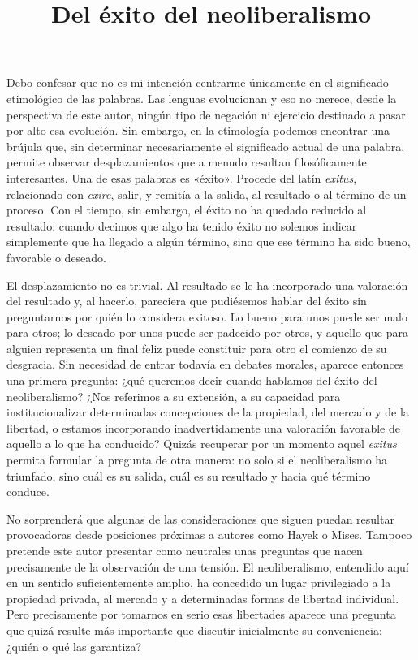 \documentclass[12pt,a4paper]{article}
\title{Del éxito del neoliberalismo}
\author{}
\date{}
\begin{document}
\maketitle

Debo confesar que no es mi intención centrarme únicamente en el significado etimológico de las palabras. Las lenguas evolucionan y eso no merece, desde la perspectiva de este autor, ningún tipo de negación ni ejercicio destinado a pasar por alto esa evolución. Sin embargo, en la etimología podemos encontrar una brújula que, sin determinar necesariamente el significado actual de una palabra, permite observar desplazamientos que a menudo resultan filosóficamente interesantes. Una de esas palabras es «éxito». Procede del latín \textit{exitus}, relacionado con \textit{exire}, salir, y remitía a la salida, al resultado o al término de un proceso. Con el tiempo, sin embargo, el éxito no ha quedado reducido al resultado: cuando decimos que algo ha tenido éxito no solemos indicar simplemente que ha llegado a algún término, sino que ese término ha sido bueno, favorable o deseado.

El desplazamiento no es trivial. Al resultado se le ha incorporado una valoración del resultado y, al hacerlo, pareciera que pudiésemos hablar del éxito sin preguntarnos por quién lo considera exitoso. Lo bueno para unos puede ser malo para otros; lo deseado por unos puede ser padecido por otros, y aquello que para alguien representa un final feliz puede constituir para otro el comienzo de su desgracia. Sin necesidad de entrar todavía en debates morales, aparece entonces una primera pregunta: ¿qué queremos decir cuando hablamos del éxito del neoliberalismo? ¿Nos referimos a su extensión, a su capacidad para institucionalizar determinadas concepciones de la propiedad, del mercado y de la libertad, o estamos incorporando inadvertidamente una valoración favorable de aquello a lo que ha conducido? Quizás recuperar por un momento aquel \textit{exitus} permita formular la pregunta de otra manera: no solo si el neoliberalismo ha triunfado, sino cuál es su salida, cuál es su resultado y hacia qué término conduce.

No sorprenderá que algunas de las consideraciones que siguen puedan resultar provocadoras desde posiciones próximas a autores como Hayek o Mises. Tampoco pretende este autor presentar como neutrales unas preguntas que nacen precisamente de la observación de una tensión. El neoliberalismo, entendido aquí en un sentido suficientemente amplio, ha concedido un lugar privilegiado a la propiedad privada, al mercado y a determinadas formas de libertad individual. Pero precisamente por tomarnos en serio esas libertades aparece una pregunta que quizá resulte más importante que discutir inicialmente su conveniencia: ¿quién o qué las garantiza?
\end{document}
